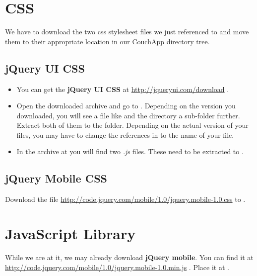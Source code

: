 \documentclass[letterpaper,10pt,english]{sphinxmanual}
\begin{document}
\section{CSS}
\label{3-Interface:css}
We have to download the two css stylesheet files we just referenced to and move them to their appropriate location in our CouchApp directory tree.


\subsection{jQuery UI CSS}
\label{3-Interface:jquery-ui-css}\begin{itemize}
\item {} 
You can get the \textbf{jQuery UI CSS} at \href{http://jqueryui.com/download}{http://jqueryui.com/download} .

\item {} 
Open the downloaded archive and go to . Depending on the version you downloaded, you will see a file like  and the directory  a sub-folder further. Extract both of them to the  folder. Depending on the actual version of your files, you may have to change the references in  to the name of your file.

\item {} 
In the archive at  you will find two \emph{.js} files. These need to be extracted to .

\end{itemize}


\subsection{jQuery Mobile CSS}
\label{3-Interface:jquery-mobile-css}
Download the file \href{http://code.jquery.com/mobile/1.0/jquery.mobile-1.0.css}{http://code.jquery.com/mobile/1.0/jquery.mobile-1.0.css} to .


\section{JavaScript Library}
\label{3-Interface:javascript-library}
While we are at it, we may already download \textbf{jQuery mobile}. You can find it at \href{http://code.jquery.com/mobile/1.0/jquery.mobile-1.0.min.js}{http://code.jquery.com/mobile/1.0/jquery.mobile-1.0.min.js} .
Place it at .
\end{document}
